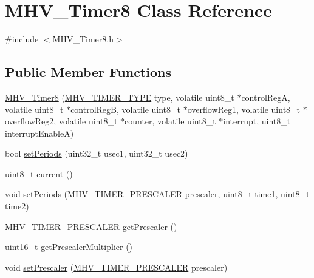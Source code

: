 \hypertarget{class_m_h_v___timer8}{
\section{\-M\-H\-V\-\_\-\-Timer8 \-Class \-Reference}
\label{class_m_h_v___timer8}
}


{\ttfamily \#include $<$\-M\-H\-V\-\_\-\-Timer8.\-h$>$}

\subsection*{\-Public \-Member \-Functions}
\begin{DoxyCompactItemize}
\item 
\hyperlink{class_m_h_v___timer8_a1e661983dc5da0563574498e48f94251}{\-M\-H\-V\-\_\-\-Timer8} (\hyperlink{_m_h_v___timer8_8h_aec9828462529f91a09d74c9abb33b611}{\-M\-H\-V\-\_\-\-T\-I\-M\-E\-R\-\_\-\-T\-Y\-P\-E} type, volatile uint8\-\_\-t $\ast$control\-Reg\-A, volatile uint8\-\_\-t $\ast$control\-Reg\-B, volatile uint8\-\_\-t $\ast$overflow\-Reg1, volatile uint8\-\_\-t $\ast$overflow\-Reg2, volatile uint8\-\_\-t $\ast$counter, volatile uint8\-\_\-t $\ast$interrupt, uint8\-\_\-t interrupt\-Enable\-A)
\item 
bool \hyperlink{class_m_h_v___timer8_a0c1158eedfde50067f9a4a51138c6f0a}{set\-Periods} (uint32\-\_\-t usec1, uint32\-\_\-t usec2)
\item 
uint8\-\_\-t \hyperlink{class_m_h_v___timer8_abf8177d8863fa27a9c3daf5f2df56613}{current} ()
\item 
void \hyperlink{class_m_h_v___timer8_a25759cd2886c1002d5377be19fc80549}{set\-Periods} (\hyperlink{_m_h_v___timer8_8h_a2e7ef9dbc200586bf55b0003896de599}{\-M\-H\-V\-\_\-\-T\-I\-M\-E\-R\-\_\-\-P\-R\-E\-S\-C\-A\-L\-E\-R} prescaler, uint8\-\_\-t time1, uint8\-\_\-t time2)
\item 
\hyperlink{_m_h_v___timer8_8h_a2e7ef9dbc200586bf55b0003896de599}{\-M\-H\-V\-\_\-\-T\-I\-M\-E\-R\-\_\-\-P\-R\-E\-S\-C\-A\-L\-E\-R} \hyperlink{class_m_h_v___timer8_aa01fcc5fd321b842e00bd12b6b938d92}{get\-Prescaler} ()
\item 
uint16\-\_\-t \hyperlink{class_m_h_v___timer8_aba018c39ad2355ba0da8357aa3b4d3dc}{get\-Prescaler\-Multiplier} ()
\item 
void \hyperlink{class_m_h_v___timer8_a106e5400b14fa7d938be056efc531c89}{set\-Prescaler} (\hyperlink{_m_h_v___timer8_8h_a2e7ef9dbc200586bf55b0003896de599}{\-M\-H\-V\-\_\-\-T\-I\-M\-E\-R\-\_\-\-P\-R\-E\-S\-C\-A\-L\-E\-R} prescaler)

\end{DoxyCompactItemize}
